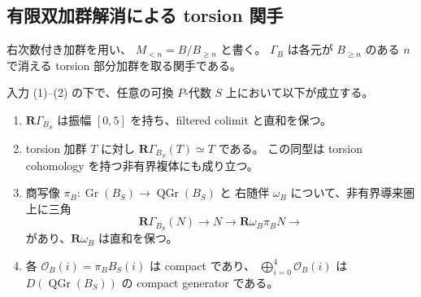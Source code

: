 \subsection{有限双加群解消による torsion 関手}

右次数付き加群を用い、
$M_{<n}=B/B_{\geq n}$ と書く。
$\Gamma_B$ は各元が $B_{\geq n}$ のある $n$ で消える torsion 部分加群を取る関手である。

\begin{lemma}
\label{lem:relative-koszul-torsion-model}
入力 (1)--(2) の下で、任意の可換 $P$-代数 $S$ 上において以下が成立する。
\begin{enumerate}
\item $\mathbf R\Gamma_{B_S}$ は振幅 $[0,5]$ を持ち、filtered colimit と直和を保つ。
\item torsion 加群 $T$ に対し $\mathbf R\Gamma_{B_S}(T)\simeq T$ である。
この同型は torsion cohomology を持つ非有界複体にも成り立つ。
\item 商写像 $\pi_B:\operatorname{Gr}(B_S)\to\operatorname{QGr}(B_S)$ と
右随伴 $\omega_B$ について、非有界導来圏上に三角
\begin{equation}\label{eq:relative-torsion-localization-triangle}
 \mathbf R\Gamma_{B_S}(N)\longrightarrow N
 \longrightarrow\mathbf R\omega_B\pi_BN\longrightarrow
\end{equation}
があり、$\mathbf R\omega_B$ は直和を保つ。
\item 各 $\mathcal O_B(i)=\pi_BB_S(i)$ は compact であり、
$\bigoplus_{i=0}^4\mathcal O_B(i)$ は
$D(\operatorname{QGr}(B_S))$ の compact generator である。
\end{enumerate}
\end{lemma}

